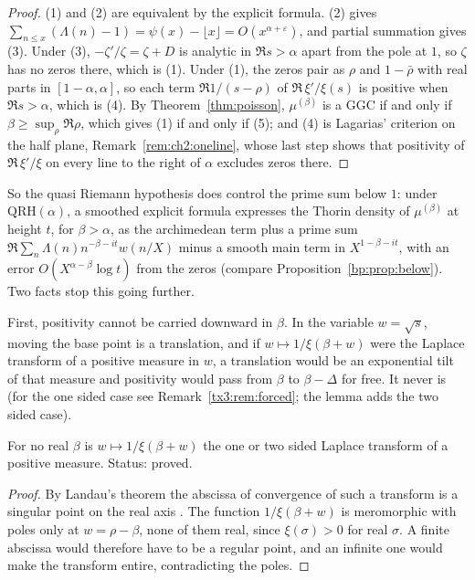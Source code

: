 \begin{proof}
(1) and (2) are equivalent by the explicit formula. (2) gives $\sum_{n\le x}(\Lambda(n)-1)=\psi(x)-\lfloor x\rfloor=O(x^{\alpha+\varepsilon})$, and partial summation gives (3). Under (3), $-\zeta'/\zeta=\zeta+D$ is analytic in $\Re s>\alpha$ apart from the pole at $1$, so $\zeta$ has no zeros there, which is (1). Under (1), the zeros pair as $\rho$ and $1-\bar\rho$ with real parts in $[1-\alpha,\alpha]$, so each term $\Re1/(s-\rho)$ of $\Re\,\xi'/\xi(s)$ is positive when $\Re s>\alpha$, which is (4). By Theorem~\ref{thm:poisson}, $\mu^{(\beta)}$ is a GGC if and only if $\beta\ge\sup_\rho\Re\rho$, which gives (1) if and only if (5); and (4) is Lagarias' criterion on the half plane, Remark~\ref{rem:ch2:oneline}, whose last step shows that positivity of $\Re\,\xi'/\xi$ on every line to the right of $\alpha$ excludes zeros there.
\end{proof}

So the quasi Riemann hypothesis does control the prime sum below $1$: under $\mathrm{QRH}(\alpha)$, a smoothed explicit formula expresses the Thorin density of $\mu^{(\beta)}$ at height $t$, for $\beta>\alpha$, as the archimedean term plus a prime sum $\Re\sum_n\Lambda(n)n^{-\beta-it}w(n/X)$ minus a smooth main term in $X^{1-\beta-it}$, with an error $O(X^{\alpha-\beta}\log t)$ from the zeros (compare Proposition~\ref{bp:prop:below}). Two facts stop this going further.

First, positivity cannot be carried downward in $\beta$. In the variable $w=\sqrt s$, moving the base point is a translation, and if $w\mapsto1/\xi(\beta+w)$ were the Laplace transform of a positive measure in $w$, a translation would be an exponential tilt of that measure and positivity would pass from $\beta$ to $\beta-\Delta$ for free. It never is (for the one sided case see Remark~\ref{tx3:rem:forced}; the lemma adds the two sided case).

\begin{lemma}\label{ht:lem:landau}
For no real $\beta$ is $w\mapsto1/\xi(\beta+w)$ the one or two sided Laplace transform of a positive measure. Status: proved.
\end{lemma}

\begin{proof}
By Landau's theorem the abscissa of convergence of such a transform is a singular point on the real axis \cite{Widder41}. The function $1/\xi(\beta+w)$ is meromorphic with poles only at $w=\rho-\beta$, none of them real, since $\xi(\sigma)>0$ for real $\sigma$. A finite abscissa would therefore have to be a regular point, and an infinite one would make the transform entire, contradicting the poles.
\end{proof}

